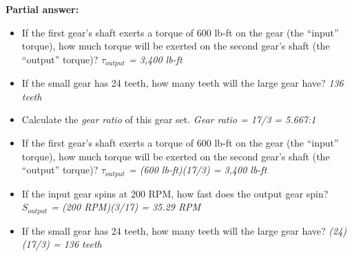 





\noindent
{\bf Partial answer:}

\begin{itemize}
\item{} If the first gear's shaft exerts a torque of 600 lb-ft on the gear (the ``input'' torque), how much torque will be exerted on the second gear's shaft (the ``output'' torque)?  {\it $\tau_{output}$ = 3,400 lb-ft}
\vskip 10pt
\item{} If the small gear has 24 teeth, how many teeth will the large gear have?  {\it 136 teeth}
\end{itemize}
 






\begin{itemize}
\item{} Calculate the {\it gear ratio} of this gear set.  {\it Gear ratio = 17/3 = 5.667:1}
\vskip 10pt
\item{} If the first gear's shaft exerts a torque of 600 lb-ft on the gear (the ``input'' torque), how much torque will be exerted on the second gear's shaft (the ``output'' torque)?  {\it $\tau_{output}$ = (600 lb-ft)(17/3) = 3,400 lb-ft}
\vskip 10pt
\item{} If the input gear spins at 200 RPM, how fast does the output gear spin?  {\it $S_{output}$ = (200 RPM)(3/17) = 35.29 RPM}
\vskip 10pt
\item{} If the small gear has 24 teeth, how many teeth will the large gear have?  {\it (24)(17/3) = 136 teeth}
\end{itemize}




